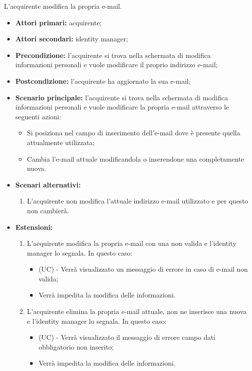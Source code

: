 L'acquirente modifica la propria e-mail.
\begin{itemize}
    \item \textbf{Attori primari:} acquirente;
    \item \textbf{Attori secondari:} identity manager;
    \item \textbf{Precondizione:} l'acquirente si trova nella schermata di modifica informazioni personali e vuole modificare il proprio indirizzo e-mail;
    \item \textbf{Postcondizione:} l'acquirente ha aggiornato la sua e-mail;
    \item \textbf{Scenario principale:} l'acquirente si trova nella schermata di modifica informazioni personali e vuole modificare la propria e-mail attraverso le seguenti azioni:
        \begin{itemize}
            \item Si posiziona nel campo di inserimento dell'e-mail dove è presente quella attualmente utilizzata;
            \item Cambia l'e-mail attuale modificandola o inserendone una completamente nuova.
        \end{itemize}
    \item \textbf{Scenari alternativi:} 
    \begin{enumerate}[label=\lett]
        \item L'acquirente non modifica l'attuale indirizzo e-mail utilizzato e per questo non cambierà.
    \end{enumerate}
    \item \textbf{Estensioni:} 
    \begin{enumerate}[label=\lett]
        \item L'acquirente modifica la propria e-mail con una non valida e l'identity manager lo segnala. In questo caso:
        \begin{itemize}
            \item (UC) - Verrà visualizzato un messaggio di errore in caso di e-mail non valida;
            \item Verrà impedita la modifica delle informazioni.
        \end{itemize}
        \item L'acquirente elimina la propria e-mail attuale, non ne inserisce una nuova e l'identity manager lo segnala. In questo caso:
        \begin{itemize}
            \item (UC) - Verrà visualizzato il messaggio di errore campo dati obbligatorio non inserito;
            \item Verrà impedita la modifica delle informazioni.
        \end{itemize}
    \end{enumerate}
\end{itemize}

